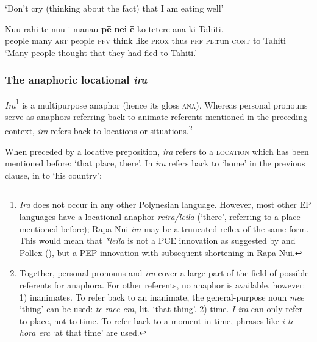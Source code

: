 \glt 
‘Don’t cry (thinking about the fact) that I am eating well’ \textstyleExampleref{[R304.033]} 
\z

\ea\label{ex:4.232}
\gll Nu{\ꞌ}u rahi te nu{\ꞌ}u i mana{\ꞌ}u \textbf{pē} \textbf{nei} \textbf{ē} ko tētere {\ꞌ}ana ki Tahiti. \\
people many \textsc{art} people \textsc{pfv} think like \textsc{prox} thus \textsc{prf} \textsc{pl}:run \textsc{cont} to Tahiti \\

\glt 
‘Many people thought that they had fled to Tahiti.’ \textstyleExampleref{[R303.051]} 
\z

\subsubsection{The anaphoric locational \textit{ira}}\label{sec:4.6.5.2}
\textit{Ira}\footnote{\label{fn:225}\textit{Ira} does not occur in any other Polynesian language. However, most other EP languages have a locational anaphor \textit{reira/leila} (‘there’, referring to a place mentioned before); Rapa Nui \textit{ira} may be a truncated reflex of the same form. This would mean that \textit{*leila} is not a PCE innovation as suggested by \citet[12]{Green1985} and Pollex (\citealt{GreenhillClark2011}), but a PEP innovation with subsequent shortening in Rapa Nui.} is a multipurpose anaphor (hence its gloss \textsc{ana}). Whereas personal pronouns serve as anaphors referring back to animate referents mentioned in the preceding context, \textit{ira} refers back to locations or situations.\footnote{\label{fn:226}Together, personal pronouns and \textit{ira} cover a large part of the field of possible referents for anaphora. For other referents, no anaphor is available, however: 1) inanimates. To refer back to an inanimate, the general-purpose noun \textit{me{\ꞌ}e} ‘thing’ can be used: \textit{te me{\ꞌ}e era}, lit. ‘that thing’. 2) time. \textit{{\ꞌ}I ira} can only refer to place, not to time. To refer back to a moment in time, phrases like \textit{{\ꞌ}i te hora era} ‘at that time’ are used.}

When preceded by a locative preposition, \textit{ira} refers to a \textsc{location} which has been mentioned before: ‘that place, there’. In  \textit{ira} refers back to ‘home’ in the previous clause, in  to ‘his country’:

